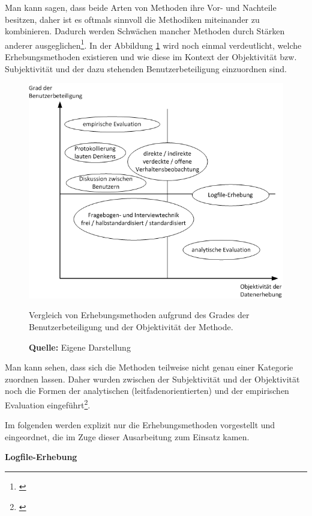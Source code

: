 Man kann sagen, dass beide Arten von Methoden ihre Vor- und Nachteile besitzen, daher ist es oftmals sinnvoll die Methodiken miteinander zu kombinieren. Dadurch werden Schwächen mancher Methoden durch Stärken anderer ausgeglichen\footnote{\cite[vgl.][261]{Pruemper1997}}. In der Abbildung \ref{fig:erhebungsmethodenObjektivitaetBenutzerbeteiligung} wird noch einmal verdeutlicht, welche Erhebungsmethoden existieren und wie diese im Kontext der Objektivität bzw. Subjektivität und der dazu stehenden Benutzerbeteiligung einzuordnen sind.
\begin{figure}[H]
  \centering
  \includegraphics[scale=0.8]{img/Datenerhebungsmethoden_Objektivitaet_Benutzerbeteiligung.png}
  \caption{Vergleich von Erhebungsmethoden aufgrund des Grades der Benutzerbeteiligung und der Objektivität der Methode.}
  \caption*{\textbf{Quelle:} Eigene Darstellung \citep[vgl.][16]{Hegner2003}}
  \label{fig:erhebungsmethodenObjektivitaetBenutzerbeteiligung}
\end{figure}
Man kann sehen, dass sich die Methoden teilweise nicht genau einer Kategorie zuordnen lassen. Daher wurden zwischen der Subjektivität und der Objektivität noch die Formen der analytischen (leitfadenorientierten) und der empirischen Evaluation eingeführt\footnote{\cite[vgl.][15]{Hegner2003}}.

Im folgenden werden explizit nur die Erhebungsmethoden vorgestellt und eingeordnet, die im Zuge dieser Ausarbeitung zum Einsatz kamen.

\textbf{Logfile-Erhebung}

